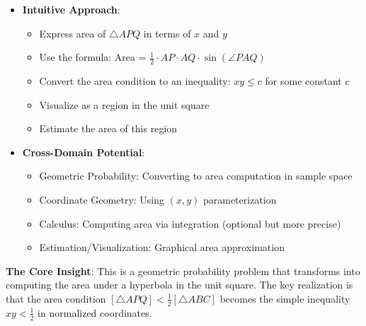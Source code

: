 \documentclass[11pt]{article}
\begin{document}
\begin{problemconfigbox}
\begin{itemize}[leftmargin=*]
    \item \textbf{Intuitive Approach}: 
    \begin{itemize}
        \item Express area of $\triangle APQ$ in terms of $x$ and $y$
        \item Use the formula: Area = $\frac{1}{2} \cdot AP \cdot AQ \cdot \sin(\angle PAQ)$
        \item Convert the area condition to an inequality: $xy \leq c$ for some constant $c$
        \item Visualize as a region in the unit square
        \item Estimate the area of this region
    \end{itemize}
    
    \item \textbf{Cross-Domain Potential}: 
    \begin{itemize}
        \item Geometric Probability: Converting to area computation in sample space
        \item Coordinate Geometry: Using $(x,y)$ parameterization
        \item Calculus: Computing area via integration (optional but more precise)
        \item Estimation/Visualization: Graphical area approximation
    \end{itemize}
\end{itemize}
\end{problemconfigbox}

\begin{keyinsight}
\textbf{The Core Insight}: This is a geometric probability problem that transforms into computing the area under a hyperbola in the unit square. The key realization is that the area condition $[\triangle APQ] < \frac{1}{2}[\triangle ABC]$ becomes the simple inequality $xy < \frac{1}{2}$ in normalized coordinates.
\end{keyinsight}
\end{document}
